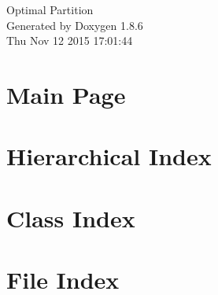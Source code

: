 \documentclass[twoside]{book}
\newcommand{\clearemptydoublepage}{%
  \newpage{\pagestyle{empty}\cleardoublepage}%
}
\begin{document}
\hypersetup{pageanchor=false}
\begin{titlepage}
\vspace*{7cm}
\begin{center}%
{\Large Optimal Partition }\\
\vspace*{1cm}
{\large Generated by Doxygen 1.8.6}\\
\vspace*{0.5cm}
{\small Thu Nov 12 2015 17:01:44}\\
\end{center}
\end{titlepage}
\clearemptydoublepage
\tableofcontents
\clearemptydoublepage
{}
\hypersetup{pageanchor=true}

\chapter{Main Page}
\label{index}\hypertarget{index}{}
\chapter{Hierarchical Index}

\chapter{Class Index}

\chapter{File Index}

\end{document}
